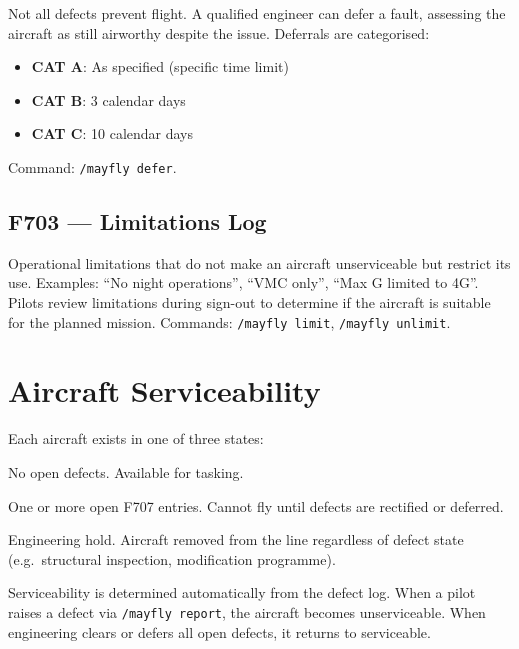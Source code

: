 \documentclass[10pt,a4paper,twocolumn]{article}
\begin{document}
Not all defects prevent flight. A qualified engineer can defer a fault, assessing the aircraft as still airworthy despite the issue. Deferrals are categorised:

\begin{itemize}
    \item \textbf{CAT A}: As specified (specific time limit)
    \item \textbf{CAT B}: 3 calendar days
    \item \textbf{CAT C}: 10 calendar days
\end{itemize}

Command: \texttt{/mayfly defer}.

\subsection{F703 --- Limitations Log}

Operational limitations that do not make an aircraft unserviceable but restrict its use. Examples: ``No night operations'', ``VMC only'', ``Max G limited to 4G''. Pilots review limitations during sign-out to determine if the aircraft is suitable for the planned mission. Commands: \texttt{/mayfly limit}, \texttt{/mayfly unlimit}.

\section{Aircraft Serviceability}

Each aircraft exists in one of three states:

\begin{description}[style=nextline,leftmargin=1em]
    \item[\textcolor{svcgreen}{Serviceable}] No open defects. Available for tasking.
    \item[\textcolor{unsvcred}{Unserviceable}] One or more open F707 entries. Cannot fly until defects are rectified or deferred.
    \item[\textcolor{gndamber}{Grounded}] Engineering hold. Aircraft removed from the line regardless of defect state (e.g.\ structural inspection, modification programme).
\end{description}

Serviceability is determined automatically from the defect log. When a pilot raises a defect via \texttt{/mayfly report}, the aircraft becomes unserviceable. When engineering clears or defers all open defects, it returns to serviceable.
\end{document}
